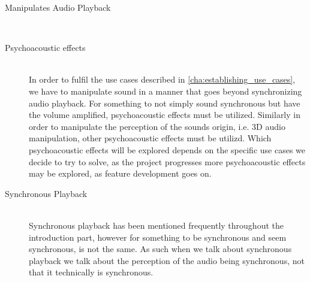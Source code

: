\begin{description}
    \item [Manipulates Audio Playback] \hfill \\

    \item [Psychoacoustic effects] \hfill \\
        In order to fulfil the use cases described in \cref{cha:establishing_use_cases}, we have to manipulate sound in a manner that goes beyond synchronizing audio playback.
        For something to not simply sound synchronous but have the volume amplified, psychoacoustic effects must be utilized.
        Similarly in order to manipulate the perception of the sounds origin, i.e. 3D audio manipulation, other psychoacoustic effects must be utilizd.
        Which psychoacoustic effects will be explored depends on the specific use cases we decide to try to solve, as the project progresses more psychoacoustic effects may be explored, as feature development goes on. 
    \item [Synchronous Playback] \hfill \\
        Synchronous playback has been mentioned frequently throughout the introduction part, however for something to be synchronous and seem synchronous, is not the same.
        As such when we talk about synchronous playback we talk about the perception of the audio being synchronous, not that it technically is synchronous.
\end{description}
